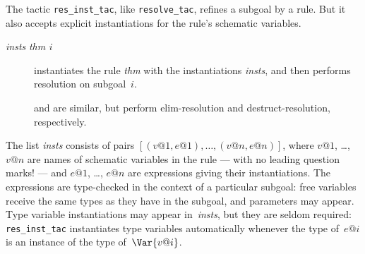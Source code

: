 The tactic {\tt res_inst_tac}, like {\tt resolve_tac}, refines a subgoal by
a rule.  But it also accepts explicit instantiations for the rule's
schematic variables.  
\begin{description}
\item[ {\it insts} {\it thm} {\it i}]
instantiates the rule {\it thm} with the instantiations {\it insts}, and
then performs resolution on subgoal~$i$.

\item[] 
and  are similar, but perform elim-resolution
and destruct-resolution, respectively.
\end{description}
The list {\it insts} consists of pairs $[(v@1,e@1), \ldots, (v@n,e@n)]$,
where $v@1$, \ldots, $v@n$ are names of schematic variables in the rule ---
with no leading question marks! --- and $e@1$, \ldots, $e@n$ are
expressions giving their instantiations.  The expressions are type-checked
in the context of a particular subgoal: free variables receive the same
types as they have in the subgoal, and parameters may appear.  Type
variable instantiations may appear in~{\it insts}, but they are seldom
required: {\tt res_inst_tac} instantiates type variables automatically
whenever the type of~$e@i$ is an instance of the type of~$\Var{v@i}$.

